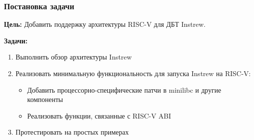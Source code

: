 \documentclass{beamer}
\begin{document}



\begin{frame}
  \frametitle{Постановка задачи}
  \textbf{Цель:} Добавить поддержку архитектуры RISC-V для ДБТ Instrew.

  \vspace{5mm}
  \textbf{Задачи:}
  \begin{enumerate}
    \item Выполнить обзор архитектуры Instrew
    \item Реализовать минимальную функциональность для запуска Instrew
          на RISC-V:
          \begin{itemize}
            \item Добавить процессорно-специфические патчи в minilibc и другие компоненты
            \item Реализовать функции, связанные с RISC-V ABI
          \end{itemize}
    \item Протестировать на простых примерах
  \end{enumerate}
\end{frame}
\end{document}
